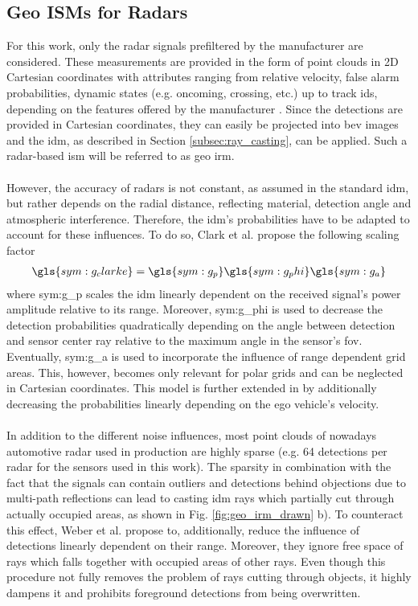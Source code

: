 \subsection{Geo ISMs for Radars}
\label{subsec:geo_ism_radar}
For this work, only the radar signals prefiltered by the manufacturer are considered. These measurements are provided in the form of point clouds in 2D Cartesian coordinates with attributes ranging from relative velocity, false alarm probabilities, dynamic states (e.g. oncoming, crossing, etc.) up to track ids, depending on the features offered by the manufacturer \cite{caesar2020nuscenes}. Since the detections are provided in Cartesian coordinates, they can easily be projected into \gls{bev} images and the \gls{idm}, as described in Section \ref{subsec:ray_casting}, can be applied. Such a radar-based \gls{ism} will be referred to as geo \gls{irm}.
\\\\
However, the accuracy of radars is not constant, as assumed in the standard \gls{idm}, but rather depends on the radial distance, reflecting material, detection angle and atmospheric interference. Therefore, the \gls{idm}'s probabilities have to be adapted to account for these influences. To do so, Clark et al. \cite{clarke2012sensor} propose the following scaling factor
\begin{align}
	\label{eq:clarke_scaling}
	\gls{sym:g_clarke} = \gls{sym:g_p} \gls{sym:g_phi} \gls{sym:g_a}
\end{align}
where \gls{sym:g_p} scales the \gls{idm} linearly dependent on the received signal's power amplitude relative to its range. Moreover, \gls{sym:g_phi} is used to decrease the detection probabilities quadratically depending on the angle between detection and sensor center ray relative to the maximum angle in the sensor's \gls{fov}. Eventually, \gls{sym:g_a} is used to incorporate the influence of range dependent grid areas. This, however, becomes only relevant for polar grids and can be neglected in Cartesian coordinates. This model is further extended in \cite{prophet2018adaptions} by additionally decreasing the probabilities linearly depending on the ego vehicle's velocity.
\\\\
In addition to the different noise influences, most point clouds of nowadays automotive radar used in production are highly sparse (e.g. 64 detections per radar for the sensors used in this work). The sparsity in combination with the fact that the signals can contain outliers and detections behind objections due to multi-path reflections can lead to casting \gls{idm} rays which partially cut through actually occupied areas, as shown in Fig. \ref{fig:geo_irm_drawn} b). To counteract this effect, Weber et al. \cite{werber2015automotive} propose to, additionally, reduce the influence of detections linearly dependent on their range. Moreover, they ignore free space of rays which falls together with occupied areas of other rays. Even though this procedure not fully removes the problem of rays cutting through objects, it highly dampens it and prohibits foreground detections from being overwritten.
